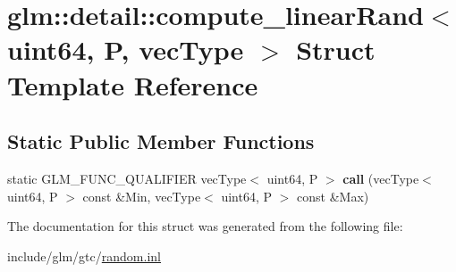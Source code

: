 \hypertarget{structglm_1_1detail_1_1compute__linearRand_3_01uint64_00_01P_00_01vecType_01_4}{}\section{glm\+:\+:detail\+:\+:compute\+\_\+linear\+Rand$<$ uint64, P, vec\+Type $>$ Struct Template Reference}
\label{structglm_1_1detail_1_1compute__linearRand_3_01uint64_00_01P_00_01vecType_01_4}
\subsection*{Static Public Member Functions}
\begin{DoxyCompactItemize}
\item 
\mbox{\label{structglm_1_1detail_1_1compute__linearRand_3_01uint64_00_01P_00_01vecType_01_4_afc443abbff12752de8c78096639a6ff4}} 
static G\+L\+M\+\_\+\+F\+U\+N\+C\+\_\+\+Q\+U\+A\+L\+I\+F\+I\+ER vec\+Type$<$ uint64, P $>$ {\bfseries call} (vec\+Type$<$ uint64, P $>$ const \&Min, vec\+Type$<$ uint64, P $>$ const \&Max)
\end{DoxyCompactItemize}


The documentation for this struct was generated from the following file\+:\begin{DoxyCompactItemize}
\item 
include/glm/gtc/\hyperlink{random_8inl}{random.\+inl}\end{DoxyCompactItemize}
